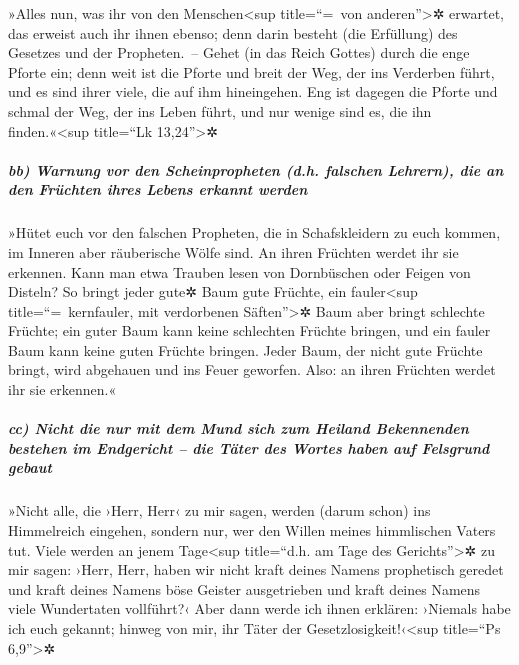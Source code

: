  »Alles nun, was ihr von den Menschen\textless sup
title=``=~von anderen''\textgreater✲ erwartet, das erweist auch ihr
ihnen ebenso; denn darin besteht (die Erfüllung) des Gesetzes und der
Propheten.~--  Gehet (in das Reich Gottes) durch die enge
Pforte ein; denn weit ist die Pforte und breit der Weg, der ins
Verderben führt, und es sind ihrer viele, die auf ihm hineingehen.
 Eng ist dagegen die Pforte und schmal der Weg, der ins
Leben führt, und nur wenige sind es, die ihn finden.«\textless sup
title=``Lk 13,24''\textgreater✲

\hypertarget{bb-warnung-vor-den-scheinpropheten-d.h.-falschen-lehrern-die-an-den-fruxfcchten-ihres-lebens-erkannt-werden}{%
\subparagraph{bb) Warnung vor den Scheinpropheten (d.h. falschen
Lehrern), die an den Früchten ihres Lebens erkannt
werden}\label{bb-warnung-vor-den-scheinpropheten-d.h.-falschen-lehrern-die-an-den-fruxfcchten-ihres-lebens-erkannt-werden}}

 »Hütet euch vor den falschen Propheten, die in
Schafskleidern zu euch kommen, im Inneren aber räuberische Wölfe sind.
 An ihren Früchten werdet ihr sie erkennen. Kann man etwa
Trauben lesen von Dornbüschen oder Feigen von Disteln? 
So bringt jeder gute✲ Baum gute Früchte, ein fauler\textless sup
title=``=~kernfauler, mit verdorbenen Säften''\textgreater✲ Baum aber
bringt schlechte Früchte;  ein guter Baum kann keine
schlechten Früchte bringen, und ein fauler Baum kann keine guten Früchte
bringen.  Jeder Baum, der nicht gute Früchte bringt, wird
abgehauen und ins Feuer geworfen.  Also: an ihren
Früchten werdet ihr sie erkennen.«

\hypertarget{cc-nicht-die-nur-mit-dem-mund-sich-zum-heiland-bekennenden-bestehen-im-endgericht-die-tuxe4ter-des-wortes-haben-auf-felsgrund-gebaut}{%
\subparagraph{cc) Nicht die nur mit dem Mund sich zum Heiland
Bekennenden bestehen im Endgericht -- die Täter des Wortes haben auf
Felsgrund
gebaut}\label{cc-nicht-die-nur-mit-dem-mund-sich-zum-heiland-bekennenden-bestehen-im-endgericht-die-tuxe4ter-des-wortes-haben-auf-felsgrund-gebaut}}

 »Nicht alle, die ›Herr, Herr‹ zu mir sagen, werden
(darum schon) ins Himmelreich eingehen, sondern nur, wer den Willen
meines himmlischen Vaters tut.  Viele werden an jenem
Tage\textless sup title=``d.h. am Tage des Gerichts''\textgreater✲ zu
mir sagen: ›Herr, Herr, haben wir nicht kraft deines Namens prophetisch
geredet und kraft deines Namens böse Geister ausgetrieben und kraft
deines Namens viele Wundertaten vollführt?‹  Aber dann
werde ich ihnen erklären: ›Niemals habe ich euch gekannt; hinweg von
mir, ihr Täter der Gesetzlosigkeit!‹\textless sup title=``Ps
6,9''\textgreater✲

